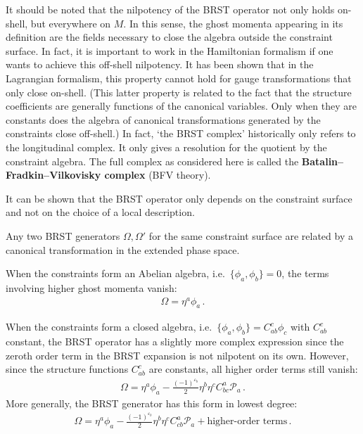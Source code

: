     \begin{remark}
        It should be noted that the nilpotency of the BRST operator not only holds on-shell, but everywhere on $M$. In this sense, the ghost momenta appearing in its definition are the fields necessary to close the algebra outside the constraint surface. In fact, it is important to work in the Hamiltonian formalism if one wants to achieve this off-shell nilpotency. It has been shown that in the Lagrangian formalism, this property cannot hold for gauge transformations that only close on-shell. (This latter property is related to the fact that the structure coefficients are generally functions of the canonical variables. Only when they are constants does the algebra of canonical transformations generated by the constraints close off-shell.) In fact, `the BRST complex' historically only refers to the longitudinal complex. It only gives a resolution for the quotient by the constraint algebra. The full complex as considered here is called the \textbf{Batalin--Fradkin--Vilkovisky complex} (BFV theory).
    \end{remark}

    It can be shown that the BRST operator only depends on the constraint surface and not on the choice of a local description.
    \begin{property}[Uniqueness]
        Any two BRST generators $\Omega,\Omega'$ for the same constraint surface are related by a canonical transformation in the extended phase space.
    \end{property}

    \begin{example}
        When the constraints form an Abelian algebra, i.e.~$\{\phi_a,\phi_b\}=0$, the terms involving higher ghost momenta vanish:
        \begin{gather}
            \Omega = \eta^a\phi_a\,.
        \end{gather}
    \end{example}
    \begin{example}
        When the constraints form a closed algebra, i.e.~$\{\phi_a,\phi_b\}=C^c_{ab}\phi_c$ with $C^c_{ab}$ constant, the BRST operator has a slightly more complex expression since the zeroth order term in the BRST expansion is not nilpotent on its own. However, since the structure functions $C^c_{ab}$ are constants, all higher order terms still vanish:
        \begin{gather}
            \Omega = \eta^a\phi_a -\frac{(-1)^{\varepsilon_b}}{2}\eta^b\eta^c C^a_{bc}\mathcal{P}_a\,.
        \end{gather}
        More generally, the BRST generator has this form in lowest degree:
        \begin{gather}
            \label{constraint:BRST_expansion}
            \Omega = \eta^a\phi_a - \frac{(-1)^{\varepsilon_b}}{2}\eta^b\eta^cC^a_{cb}\mathcal{P}_a + \text{higher-order terms}\,.
        \end{gather}
    \end{example}

